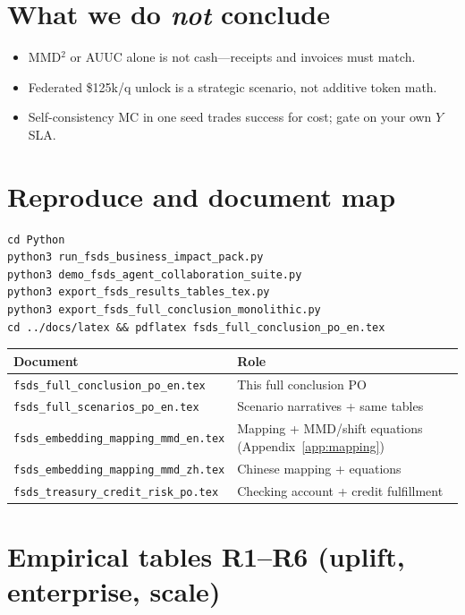 \documentclass[11pt]{article}
\begin{document}
\section{What we do \emph{not} conclude}

\begin{itemize}[nosep]
  \item MMD$^2$ or AUUC alone is not cash---receipts and invoices must match.
  \item Federated \$125k/q unlock is a strategic scenario, not additive token math.
  \item Self-consistency MC in one seed trades success for cost; gate on your own $Y$ SLA.
\end{itemize}

\section{Reproduce and document map}

\begin{verbatim}
cd Python
python3 run_fsds_business_impact_pack.py
python3 demo_fsds_agent_collaboration_suite.py
python3 export_fsds_results_tables_tex.py
python3 export_fsds_full_conclusion_monolithic.py
cd ../docs/latex && pdflatex fsds_full_conclusion_po_en.tex
\end{verbatim}

\begin{center}
\small
\begin{tabular}{@{}ll@{}}
\toprule
Document & Role \\
\midrule
\texttt{fsds\_full\_conclusion\_po\_en.tex} & This full conclusion PO \\
\texttt{fsds\_full\_scenarios\_po\_en.tex} & Scenario narratives + same tables \\
\texttt{fsds\_embedding\_mapping\_mmd\_en.tex} & Mapping + MMD/shift equations (Appendix~\ref{app:mapping}) \\
\texttt{fsds\_embedding\_mapping\_mmd\_zh.tex} & Chinese mapping + equations \\
\texttt{fsds\_treasury\_credit\_risk\_po.tex} & Checking account + credit fulfillment \\
\bottomrule
\end{tabular}
\end{center}

\appendix

\section{Empirical tables R1--R6 (uplift, enterprise, scale)}
\label{app:r1-r6}

\end{document}

